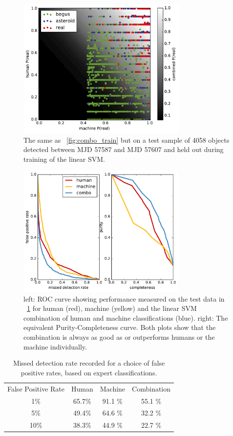 \documentclass[a4paper,fleqn,usenatbib]{mnras}
\begin{document}
\begin{figure}
   \includegraphics[width=84mm]{figs/human_v_machine_test.pdf}
   \caption{The same as ~\ref{fig:combo_train} but on a test sample of 4058 objects detected between
            MJD 57587 and MJD 57607 and held out during training of the linear SVM.} 
   \label{fig:combo_test} 
\end{figure}

\begin{figure}
   \includegraphics[width=84mm]{figs/roc.pdf}
   \caption{left: ROC curve showing performance measured on the test data in ~\ref{fig:combo_test} for human (red), machine (yellow) and
            the linear SVM combination of human and machine classifications (blue).  right: The equivalent Purity-Completeness curve.  Both
            plots show that the combination is always as good as or outperforms humans or the machine individually.} 
   \label{fig:roc} 
\end{figure}

\begin{table}
\begin{tabular}{|c|c|c|c|}
False Positive Rate & Human & Machine & Combination\\
1\% & 65.7\% & 91.1 \% & 55.1 \% \\
5\% & 49.4\% & 64.6 \% & 32.2 \% \\
10\% & 38.3\% & 44.9 \% & 22.7 \%\\
\end{tabular}
\caption{Missed detection rate recorded for a choice of false positive rates, based on expert classifications.}\label{tab:roc}
\end{table}
\end{document}
